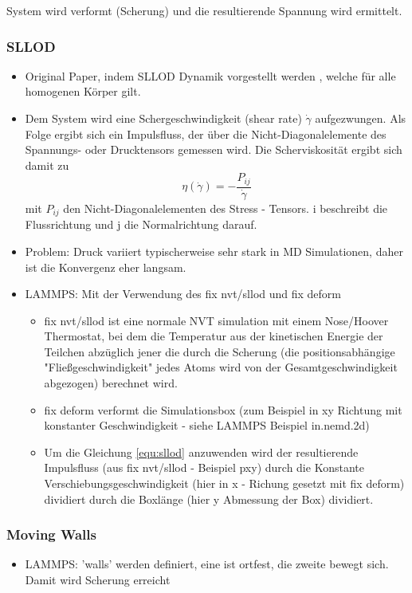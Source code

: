 \documentclass[a4paper, 10pt, 
               numbers=noenddot, toc=graduated,
               headsepline=true, footsepline=true,
               twoside=false, titlepage=true, 
               bibliography=totoc]{scrartcl}
\begin{document}
System wird verformt (Scherung) und die resultierende Spannung wird ermittelt. 


	\subsubsection{SLLOD}
		\begin{itemize}
		 	\item Original Paper, indem SLLOD Dynamik vorgestellt werden \cite{Evans1984}, welche für alle homogenen Körper gilt.
		 	\item Dem System wird eine Schergeschwindigkeit (shear rate) $\dot{\gamma}$ aufgezwungen. Als Folge ergibt sich ein Impulsfluss, der über die Nicht-Diagonalelemente des Spannungs- oder Drucktensors gemessen wird\cite{Tenney2010}. Die Scherviskosität ergibt sich damit zu 
				\begin{equation}
					\eta\left(\dot{\gamma}\right) = - \frac{P_{ij}}{\dot{\gamma}}
					\label{equ:sllod}
				\end{equation}
 mit $P_{ij}$ den Nicht-Diagonalelementen des Stress - Tensors. i beschreibt die Flussrichtung und j die Normalrichtung darauf. 
		 	\item Problem: Druck variiert typischerweise sehr stark in MD Simulationen, daher ist die Konvergenz eher langsam\cite{Tenney2010}.
		 	\item LAMMPS: Mit der Verwendung des fix nvt/sllod und fix deform 
				\begin{itemize}
					\item fix nvt/sllod ist eine normale NVT simulation mit einem Nose/Hoover Thermostat, bei dem die Temperatur aus der kinetischen Energie der Teilchen abzüglich jener die durch die Scherung (die positionsabhängige "Fließgeschwindigkeit" jedes Atoms wird von der Gesamtgeschwindigkeit abgezogen) berechnet wird.
					\item fix deform verformt die Simulationsbox (zum Beispiel in xy Richtung mit konstanter Geschwindigkeit - siehe LAMMPS Beispiel in.nemd.2d)
					\item Um die Gleichung \ref{equ:sllod} anzuwenden wird der resultierende Impulsfluss (aus fix nvt/sllod - Beispiel pxy) durch die Konstante Verschiebungsgeschwindigkeit (hier in x - Richung gesetzt mit fix deform) dividiert durch die Boxlänge (hier y Abmessung der Box) dividiert. 
				\end{itemize}
		\end{itemize}
		
	\subsubsection{Moving Walls}
	    \begin{itemize}
		 	\item LAMMPS: 'walls' werden definiert, eine ist ortfest, die zweite bewegt sich. Damit wird Scherung erreicht
		\end{itemize}
\end{document}
